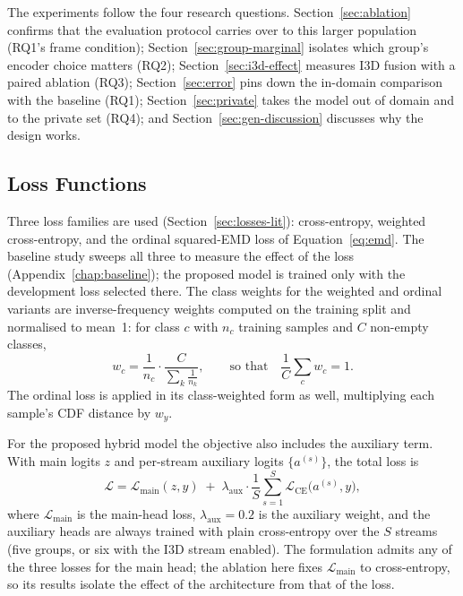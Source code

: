 \documentclass[../main.tex]{subfiles}
\begin{document}
The experiments follow the four research questions. Section~\ref{sec:ablation} confirms that the evaluation protocol carries over to this larger population (RQ1's frame condition); Section~\ref{sec:group-marginal} isolates which group's encoder choice matters (RQ2); Section~\ref{sec:i3d-effect} measures I3D fusion with a paired ablation (RQ3); Section~\ref{sec:error} pins down the in-domain comparison with the baseline (RQ1); Section~\ref{sec:private} takes the model out of domain and to the private set (RQ4); and Section~\ref{sec:gen-discussion} discusses why the design works.

\subsection{Loss Functions}
\label{sec:losses-method}

Three loss families are used (Section~\ref{sec:losses-lit}): cross-entropy, weighted cross-entropy, and the ordinal squared-EMD loss of Equation~\eqref{eq:emd}. The baseline study sweeps all three to measure the effect of the loss (Appendix~\ref{chap:baseline}); the proposed model is trained only with the development loss selected there. The class weights for the weighted and ordinal variants are inverse-frequency weights computed on the training split and normalised to mean~1: for class $c$ with $n_c$ training samples and $C$ non-empty classes,
\begin{equation}
w_c = \frac{1}{n_c}\cdot\frac{C}{\sum_{k} \frac{1}{n_k}},
\qquad\text{so that}\quad \frac{1}{C}\sum_c w_c = 1 .
\end{equation}
The ordinal loss is applied in its class-weighted form as well, multiplying each sample's CDF distance by $w_y$.

For the proposed hybrid model the objective also includes the auxiliary term. With main logits $z$ and per-stream auxiliary logits $\{a^{(s)}\}$, the total loss is
\begin{equation}
\mathcal{L} = \mathcal{L}_{\text{main}}(z,y) \;+\; \lambda_{\text{aux}}\cdot\frac{1}{S}\sum_{s=1}^{S}
              \mathcal{L}_{\text{CE}}\!\bigl(a^{(s)},y\bigr),
\end{equation}
where $\mathcal{L}_{\text{main}}$ is the main-head loss, $\lambda_{\text{aux}}=0.2$ is the auxiliary weight, and the auxiliary heads are always trained with plain cross-entropy over the $S$ streams (five groups, or six with the I3D stream enabled). The formulation admits any of the three losses for the main head; the ablation here fixes $\mathcal{L}_{\text{main}}$ to cross-entropy, so its results isolate the effect of the architecture from that of the loss.
\end{document}
